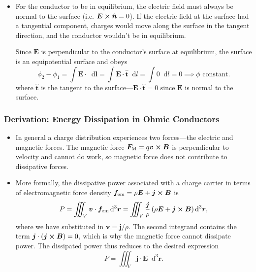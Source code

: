 \documentclass[11pt, a4paper]{article}
\newcommand{\diff}{\mathop{}\!\mathrm{d}} %
\newcommand{\dr}{\diff^{3} \r}  %
\renewcommand{\vec}[1]{\bm{#1}} %
\newcommand{\uvec}[1]{\hat{\vec{#1}}} %
\renewcommand{\r}{\vec{r}}
\newcommand{\E}{\vec{E}} %
\newcommand{\B}{\vec{B}} %
\renewcommand{\j}{\vec{j}}  %
\begin{document}
\begin{itemize}
	\item For the conductor to be in equilibrium, the electric field must always be normal to the surface (i.e. $ \E \cross \uvec{n} = 0 $). If the electric field at the surface had a tangential component, charges would move along the surface in the tangent direction, and the conductor wouldn't be in equilibrium. 
	
	Since $ \E $ is perpendicular to the conductor's surface at equilibrium, the surface is an equipotential surface and obeys
	\begin{equation*}
		\phi_{2} - \phi_{1} = \int \E \cdot \diff \vec{l} = \int \E \cdot \uvec{t} \diff l = \int 0 \diff l = 0 \implies \phi \text{ constant}.
	\end{equation*}
	where $ \uvec{t} $ is the tangent to the surface---$ \E \cdot \uvec{t} = 0$ since $ \E $ is normal to the surface. 

\end{itemize}

\subsubsection{Derivation: Energy Dissipation in Ohmic Conductors} \label{sss:ohmic-dissipation}
\begin{itemize}
    \item In general a charge distribution experiences two forces---the electric and magnetic forces. The magnetic force $ \vec{F}_{\text{M}} = q \vec{v} \cross \B  $ is perpendicular to velocity and cannot do work, so magnetic force does not contribute to dissipative forces. 
	
    \item More formally, the dissipative power associated with a charge carrier in terms of electromagnetic force density $ \vec{f}_{\text{em}} = \rho \E + \j \cross \B $ is
	\begin{equation*}
		P = \iiint_{V} \vec{v} \cdot \vec{f}_{\text{em}} \dr = \iiint_{V} \frac{\j}{\rho} \left(\rho \E + \j \cross \B\right)\dr,
	\end{equation*}
	where we have substituted in $ \vec{v} = \j/\rho $. The second integrand contains the term $ \j \cdot (\j \cross \B) = 0 $, which is why the magnetic force cannot dissipate power. The dissipated power thus reduces to the desired expression
	\begin{equation*}
		P = \iiint_{V} \j \cdot \E \dr.
	\end{equation*}
		
\end{itemize}
\end{document}
